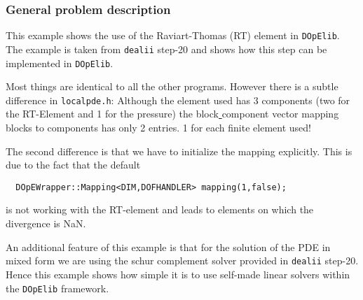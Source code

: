 \subsubsection{General problem description}
This example shows the use of the Raviart-Thomas (RT) element in \texttt{DOpElib}. The example 
is taken from \texttt{dealii} step-20 and shows how this step can be implemented in \texttt{DOpElib}.

Most things are identical to all the other programs. However there is a subtle difference in 
\texttt{localpde.h}: Although the element used has 3 components (two for the RT-Element and 1 for the pressure)
the block\underline{ }component vector mapping blocks to components has only 2 entries. 1 for each finite element used!

The second difference is that we have to initialize the mapping explicitly. This is due to the fact that the 
default 
\begin{verbatim}
  DOpEWrapper::Mapping<DIM,DOFHANDLER> mapping(1,false);
\end{verbatim}
is not working with the RT-element and leads to elements on which the divergence is NaN.

An additional feature of this example is that for the solution of the PDE in mixed form we are using the 
schur complement solver provided in \texttt{dealii} step-20. Hence this example shows how simple it is to 
use self-made linear solvers within the \texttt{DOpElib} framework.
